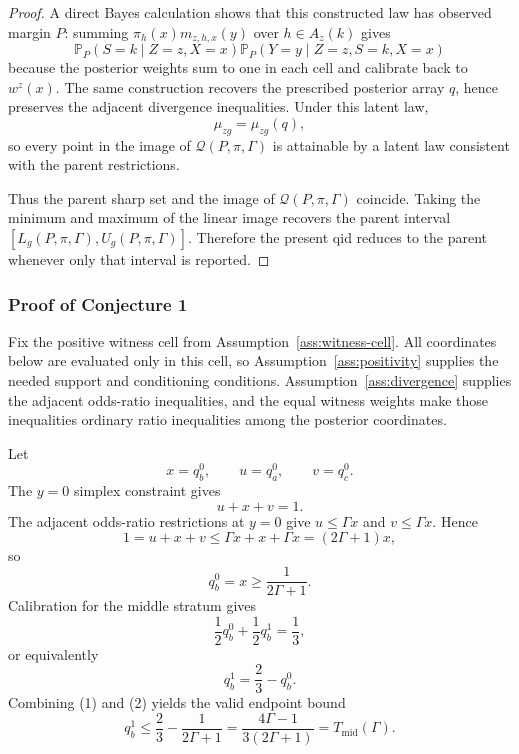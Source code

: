 \documentclass[11pt]{article}
\renewcommand{\Pr}{\mathbb{P}}
\theoremstyle{definition}
\theoremstyle{plain}
\theoremstyle{remark}
\begin{document}
\begin{proof}
A direct Bayes calculation shows that this constructed law has observed margin \(P\): summing \(\pi_h(x)m_{z,h,x}(y)\) over \(h\in A_z(k)\) gives
\[
  \Pr_P(S=k\mid Z=z,X=x)\Pr_P(Y=y\mid Z=z,S=k,X=x)
\]
because the posterior weights sum to one in each cell and calibrate back to \(w^z(x)\).  The same construction recovers the prescribed posterior array \(q\), hence preserves the adjacent divergence inequalities.  Under this latent law,
\[
  \mu_{zg}=\mu_{zg}(q),
\]
so every point in the image of \(\mathcal Q(P,\pi,\Gamma)\) is attainable by a latent law consistent with the parent restrictions.

Thus the parent sharp set and the image of \(\mathcal Q(P,\pi,\Gamma)\) coincide.  Taking the minimum and maximum of the linear image recovers the parent interval \([L_g(P,\pi,\Gamma),U_g(P,\pi,\Gamma)]\).  Therefore the present qid reduces to the parent whenever only that interval is reported.
\end{proof}

\subsubsection*{Proof of Conjecture 1}
Fix the positive witness cell from Assumption~\ref{ass:witness-cell}.  All coordinates below are evaluated only in this cell, so Assumption~\ref{ass:positivity} supplies the needed support and conditioning conditions.  Assumption~\ref{ass:divergence} supplies the adjacent odds-ratio inequalities, and the equal witness weights make those inequalities ordinary ratio inequalities among the posterior coordinates.

Let
\[
  x=q_b^0,\qquad u=q_a^0,\qquad v=q_c^0.
\]
The \(y=0\) simplex constraint gives
\[
  u+x+v=1.
\]
The adjacent odds-ratio restrictions at \(y=0\) give \(u\le \Gamma x\) and \(v\le \Gamma x\).  Hence
\[
  1=u+x+v\le \Gamma x+x+\Gamma x=(2\Gamma+1)x,
\]
so
\[
  q_b^0=x\ge \frac{1}{2\Gamma+1}. \tag{1}
\]
Calibration for the middle stratum gives
\[
  \frac12 q_b^0+\frac12 q_b^1=\frac13,
\]
or equivalently
\[
  q_b^1=\frac23-q_b^0. \tag{2}
\]
Combining (1) and (2) yields the valid endpoint bound
\[
  q_b^1\le \frac23-\frac{1}{2\Gamma+1}
  =\frac{4\Gamma-1}{3(2\Gamma+1)}
  =T_{\mathrm{mid}}(\Gamma). \tag{3}
\]
\end{document}
